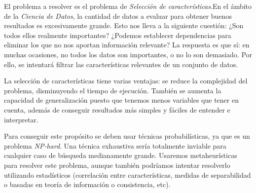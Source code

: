 El problema a resolver es el problema de \emph{Selección de características}.En el ámbito de la \emph{Ciencia de Datos}, la cantidad de datos a evaluar para obtener buenos resultados es excesivamente grande. Esto nos lleva a la siguiente cuestión: ¿Son todos ellos realmente importantes? ¿Podemos establecer dependencias para eliminar los que no nos aportan información relevante? La respuesta es que sí: en muchas ocasiones, no todos los datos son importantes, o no lo son demasiado. Por ello, se intentará filtrar las características relevantes de un conjunto de datos.

La selección de características tiene varias ventajas: se reduce la complejidad del problema, disminuyendo el tiempo de ejecución. También se aumenta la capacidad de generalización puesto que tenemos menos variables que tener en cuenta, además de conseguir resultados más simples y fáciles de entender e interpretar.

Para conseguir este propósito se deben usar técnicas probabilísticas, ya que es un problema \emph{NP-hard}. Una técnica exhaustiva sería totalmente inviable para cualquier caso de búsqueda medianamente grande. Usaremos metaheurísticas para resolver este problema, aunque también podríamos intentar resolverlo utilizando estadísticos (correlación entre características, medidas de separabilidad o basadas en teoría de información o consistencia, etc).
